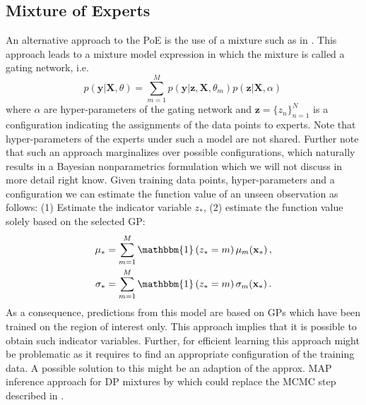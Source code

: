 \documentclass[10pt,letterpaper]{article}
\newcommand\indic[1]{\ensuremath{\mathbbm{1}\left(#1\right)}}
\newcommand{\X}{\mathbf{X}}
\newcommand{\x}{\mathbf{x}}
\newcommand{\y}{\mathbf{y}}
\newcommand{\new}{_{*}}
\theoremstyle{mystyle}
\begin{document}
\subsection{Mixture of Experts}
An alternative approach to the PoE is the use of a mixture such as in \cite{RasmussenG2001}.
This approach leads to a mixture model expression in which the mixture is called a gating network, i.e.
\[
  p(\y | \X, \theta) = \sum_{m=1}^M p(\y | \bm z, \X, \theta_m) p(\bm z | \X, \alpha) \,
\]
where $\alpha$ are hyper-parameters of the gating network and $\bm z =\{z_n\}_{n=1}^N$ is a configuration indicating the assignments of the data points to experts.
Note that hyper-parameters of the experts under such a model are not shared.
Further note that such an approach marginalizes over possible configurations, which naturally results in a Bayesian nonparametrics formulation which we will not discuss in more detail right know.
Given training data points, hyper-parameters and a configuration we can estimate the function value of an unseen observation as follows: (1) Estimate the indicator variable $z\new$, (2) estimate the function value solely based on the selected GP:
\begin{align}
  \mu\new &= \sum_{m=1}^M \indic{z\new = m} \mu_m(\x\new) \, , \\
  \sigma\new &= \sum_{m=1}^M \indic{z\new = m} \sigma_m(\x\new) \, .
\end{align}
As a consequence, predictions from this model are based on GPs which have been trained on the region of interest only.
This approach implies that it is possible to obtain such indicator variables.
Further, for efficient learning this approach might be problematic as it requires to find an appropriate configuration of the training data.
A possible solution to this might be an adaption of the approx. MAP inference approach for DP mixtures by \cite{Raykov2016} which could replace the MCMC step described in \cite{RasmussenG2001}.
\end{document}
